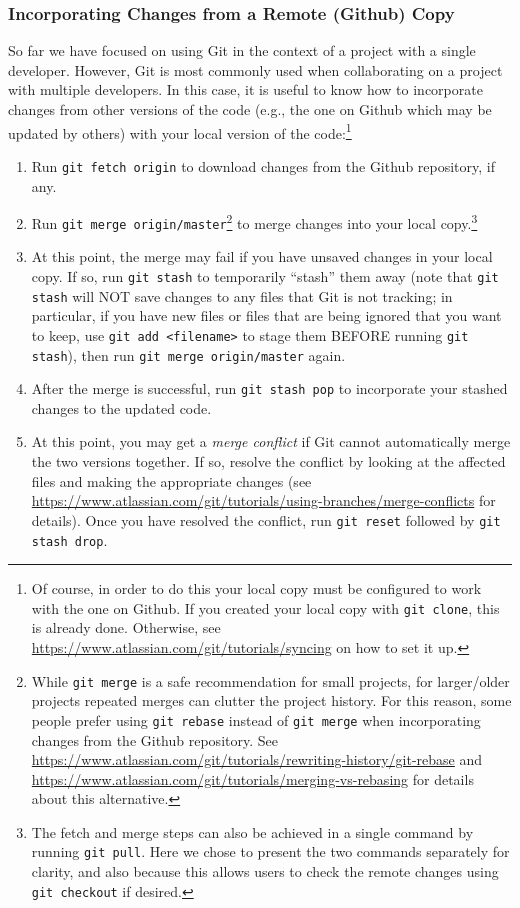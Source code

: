 \documentclass[12pt]{article}
\begin{document}
\subsubsection{Incorporating Changes from a Remote (Github) Copy}
So far we have focused on using Git in the context of a project with a single developer. However, Git is most commonly used when collaborating on a project with multiple developers. In this case, it is useful to know how to incorporate changes from other versions of the code (e.g., the one on Github which may be updated by others) with your local version of the code:\footnote{Of course, in order to do this your local copy must be configured to work with the one on Github. If you created your local copy with \texttt{git clone}, this is already done. Otherwise, see \url{https://www.atlassian.com/git/tutorials/syncing} on how to set it up.}
\begin{enumerate}
    \item Run \texttt{git fetch origin} to download changes from the Github repository, if any.
    \item Run \texttt{git merge origin/master}\footnote{While \texttt{git merge} is a safe recommendation for small projects, for larger/older projects repeated merges can clutter the project history. For this reason, some people prefer using \texttt{git rebase} instead of \texttt{git merge} when incorporating changes from the Github repository. See \url{https://www.atlassian.com/git/tutorials/rewriting-history/git-rebase} and \url{https://www.atlassian.com/git/tutorials/merging-vs-rebasing} for details about this alternative.} to merge changes into your local copy.\footnote{The fetch and merge steps can also be achieved in a single command by running \texttt{git pull}. Here we chose to present the two commands separately for clarity, and also because this allows users to check the remote changes using \texttt{git checkout} if desired.}
    \item At this point, the merge may fail if you have unsaved changes in your local copy. If so, run \texttt{git stash} to temporarily ``stash'' them away (note that \texttt{git stash} will NOT save changes to any files that Git is not tracking; in particular, if you have new files or files that are being ignored that you want to keep, use \texttt{git add <filename>} to stage them BEFORE running \texttt{git stash}), then run \texttt{git merge origin/master} again.
    \item After the merge is successful, run \texttt{git stash pop} to incorporate your stashed changes to the updated code.
    \item At this point, you may get a \emph{merge conflict} if Git cannot automatically merge the two versions together. If so, resolve the conflict by looking at the affected files and making the appropriate changes (see \url{https://www.atlassian.com/git/tutorials/using-branches/merge-conflicts} for details). Once you have resolved the conflict, run \texttt{git reset} followed by \texttt{git stash drop}.
\end{enumerate}
\end{document}
